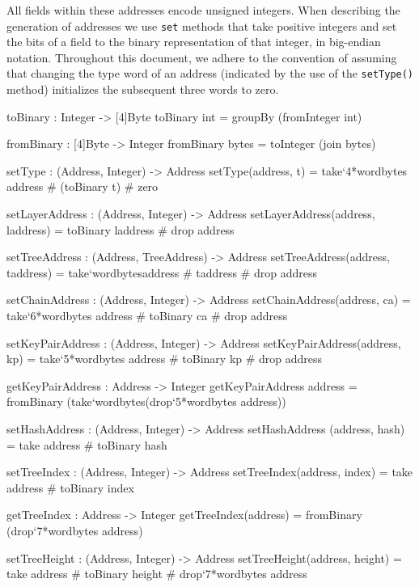 
   All fields within these addresses encode unsigned integers.  When
   describing the generation of addresses we use \texttt{set} methods that
   take positive integers and set the bits of a field to the binary
   representation of that integer, in big-endian
   notation. Throughout this document, we adhere to the convention
   of assuming that changing the type word of an address
   (indicated by the use of the \texttt{setType()} method)
   initializes the subsequent three words to zero.

\begin{code}
  toBinary : Integer -> [4]Byte
  toBinary int = groupBy (fromInteger int)

  fromBinary : [4]Byte -> Integer
  fromBinary bytes = toInteger (join bytes)
\end{code}

\begin{code}
  setType : (Address, Integer) -> Address
  setType(address, t) = take`{4*wordbytes} address # (toBinary t) # zero

  setLayerAddress : (Address, Integer) -> Address
  setLayerAddress(address, laddress) = toBinary laddress # drop address

  setTreeAddress : (Address, TreeAddress) -> Address
  setTreeAddress(address, taddress) =
      take`{wordbytes}address # taddress # drop address

  setChainAddress : (Address, Integer) -> Address
  setChainAddress(address, ca) =
      take`{6*wordbytes} address # toBinary ca # drop address

  setKeyPairAddress : (Address, Integer) -> Address
  setKeyPairAddress(address, kp) =
      take`{5*wordbytes} address # toBinary kp # drop address

  getKeyPairAddress : Address -> Integer
  getKeyPairAddress address =
    fromBinary (take`{wordbytes}(drop`{5*wordbytes} address))

  setHashAddress : (Address, Integer) -> Address
  setHashAddress (address, hash) = take address # toBinary hash

  setTreeIndex : (Address, Integer) -> Address
  setTreeIndex(address, index) = take address # toBinary index

  getTreeIndex : Address -> Integer
  getTreeIndex(address) = fromBinary (drop`{7*wordbytes} address)

  setTreeHeight : (Address, Integer) -> Address
  setTreeHeight(address, height) =
      take address # toBinary height # drop`{7*wordbytes} address
\end{code}

